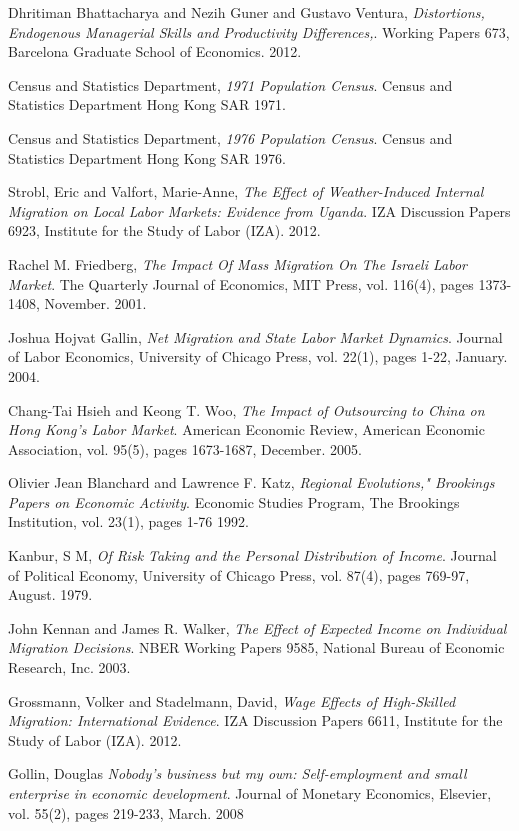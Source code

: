 \documentclass[12pt]{article}
\begin{document}
\begin{thebibliography}{56}

 Dhritiman Bhattacharya and Nezih Guner and Gustavo Ventura,
  \emph{Distortions, Endogenous Managerial Skills and Productivity Differences,}.
  Working Papers 673, Barcelona Graduate School of Economics.
  2012.

 Census and Statistics Department,
  \emph{1971 Population Census}.
	Census and Statistics Department Hong Kong SAR
  1971.

 Census and Statistics Department,
  \emph{1976 Population Census}.
	Census and Statistics Department Hong Kong SAR
  1976.
	
 Strobl, Eric and Valfort, Marie-Anne,
  \emph{The Effect of Weather-Induced Internal Migration on Local Labor Markets: Evidence from Uganda}.
  IZA Discussion Papers 6923, Institute for the Study of Labor (IZA).
  2012.

 Rachel M. Friedberg,
 \emph{The Impact Of Mass Migration On The Israeli Labor Market}.
 The Quarterly Journal of Economics, MIT Press, vol. 116(4), pages 1373-1408, November.
 2001.

 Joshua Hojvat Gallin,
  \emph{Net Migration and State Labor Market Dynamics}.
  Journal of Labor Economics, University of Chicago Press, vol. 22(1), pages 1-22, January.
  2004.

 Chang-Tai Hsieh and Keong T. Woo,
  \emph{The Impact of Outsourcing to China on Hong Kong's Labor Market}.
  American Economic Review, American Economic Association, vol. 95(5), pages 1673-1687, December.
  2005.

  Olivier Jean Blanchard and Lawrence F. Katz,
  \emph{Regional Evolutions," Brookings Papers on Economic Activity}.
  Economic Studies Program, The Brookings Institution, vol. 23(1), pages 1-76
  1992.
	
 Kanbur, S M,
  \emph{Of Risk Taking and the Personal Distribution of Income}.
  Journal of Political Economy, University of Chicago Press, vol. 87(4), pages 769-97, August.
  1979.


 John Kennan and James R. Walker,
  \emph{The Effect of Expected Income on Individual Migration Decisions}.
  NBER Working Papers 9585, National Bureau of Economic Research, Inc.
  2003.


	


 Grossmann, Volker and Stadelmann, David,
 \emph{Wage Effects of High-Skilled Migration: International Evidence}.
 IZA Discussion Papers 6611, Institute for the Study of Labor (IZA).
  2012.
	

Gollin, Douglas
 \emph{Nobody's business but my own: Self-employment and small enterprise in economic development}.
 Journal of Monetary Economics, Elsevier, vol. 55(2), pages 219-233, March. 2008
	
\end{thebibliography}
\end{document}
